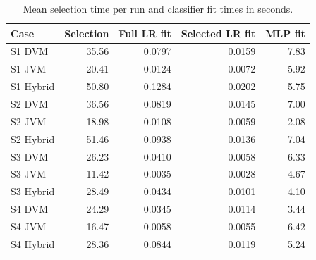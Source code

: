 \begin{table}[htbp]
\centering\small
\caption{Mean selection time per run and classifier fit times in seconds.}\label{tab:rev_time}
\begin{tabular}{lrrrr}
\hline
Case & Selection & Full LR fit & Selected LR fit & MLP fit \\ \hline
S1 DVM & 35.56 & 0.0797 & 0.0159 & 7.83 \\
S1 JVM & 20.41 & 0.0124 & 0.0072 & 5.92 \\
S1 Hybrid & 50.80 & 0.1284 & 0.0202 & 5.75 \\
S2 DVM & 36.56 & 0.0819 & 0.0145 & 7.00 \\
S2 JVM & 18.98 & 0.0108 & 0.0059 & 2.08 \\
S2 Hybrid & 51.46 & 0.0938 & 0.0136 & 7.04 \\
S3 DVM & 26.23 & 0.0410 & 0.0058 & 6.33 \\
S3 JVM & 11.42 & 0.0035 & 0.0028 & 4.67 \\
S3 Hybrid & 28.49 & 0.0434 & 0.0101 & 4.10 \\
S4 DVM & 24.29 & 0.0345 & 0.0114 & 3.44 \\
S4 JVM & 16.47 & 0.0058 & 0.0055 & 6.42 \\
S4 Hybrid & 28.36 & 0.0844 & 0.0119 & 5.24 \\
\hline
\end{tabular}
\end{table}
